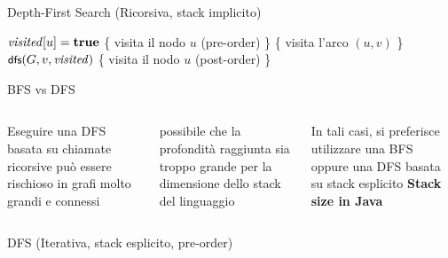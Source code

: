 \begin{frame}{Depth-First Search (Ricorsiva, stack implicito)}
	
\begin{Procedure}
\caption[A]{\dfsproc(\Graph $G$, \Node\ $u$, $\BOOLEAN[\,]\ \mmark$)}
  
$\mmark[u] = \TRUE$\;
\{ \alert{visita il nodo $u$ (pre-order)} \}\;
{
  \If{\NOT $\mmark[v]$}
  {
    \{ \alert{visita l'arco $(u,v)$} \}\;
    $\textsf{{\small dfs}}(G, v, \mathit{visited})$\; 
  }
}
\{ \alert{visita il nodo $u$ (post-order)} \}\;
\end{Procedure}


\end{frame}

\begin{frame}{BFS vs DFS}

\begin{columns}[T]
\BIL
\item Eseguire una DFS basata su chiamate ricorsive può essere rischioso in
grafi molto grandi e connessi
\item \EE possibile che la profondità raggiunta sia troppo grande per la
dimensione dello stack del linguaggio
\item In tali casi, si preferisce utilizzare una BFS oppure una DFS
basata su stack esplicito
\EIL
{}
\textbf{Stack size in Java}

\smallskip
{}
\end{columns}
    
\end{frame}

\begin{frame}[shrink=15]{DFS (Iterativa, stack esplicito, pre-order)}

\vspace{-12pt}

\end{frame}


